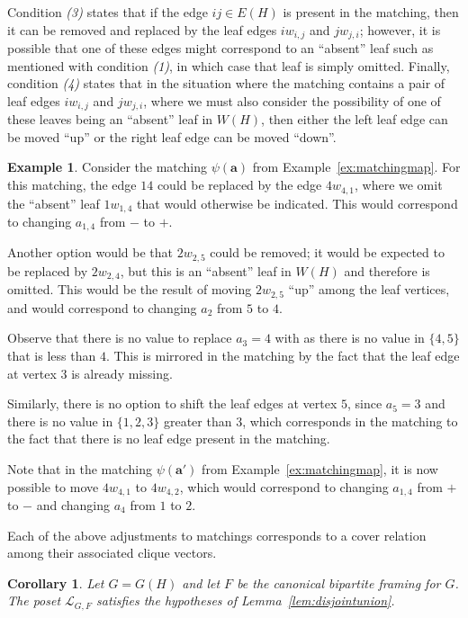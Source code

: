 \documentclass[12pt]{amsart}
\newtheorem{corollary}[theorem]{Corollary}
\theoremstyle{definition}
\newtheorem{example}[theorem]{Example}
\newcommand\ba{\mathbf{a}}
\newcommand{\scrL}{\mathscr{L}}
\begin{document}
Condition \emph{(3)} states that if the edge $ij\in E(H)$ is present in the matching, then it can be removed and replaced by the leaf edges $iw_{i,j}$ and $jw_{j,i}$; however, it is possible that one of these edges might correspond to an ``absent'' leaf such as mentioned with condition \emph{(1)}, in which case that leaf is simply omitted.
Finally, condition \emph{(4)} states that in the situation where the matching contains a pair of leaf edges $iw_{i,j}$ and $jw_{j,i}$, where we must also consider the possibility of one of these leaves being an ``absent'' leaf in $W(H)$, then either the left leaf edge can be moved ``up'' or the right leaf edge can be moved ``down''.

\begin{example}
    Consider the matching $\psi(\ba)$ from Example~\ref{ex:matchingmap}.
    For this matching, the edge $14$ could be replaced by the edge $4w_{4,1}$, where we omit the ``absent'' leaf $1w_{1,4}$ that would otherwise be indicated.
    This would correspond to changing $a_{1,4}$ from $-$ to $+$.
    
    Another option would be that $2w_{2,5}$ could be removed; it would be expected to be replaced by $2w_{2,4}$, but this is an ``absent'' leaf in $W(H)$ and therefore is omitted.
    This would be the result of moving $2w_{2,5}$ ``up'' among the leaf vertices, and would correspond to changing $a_2$ from $5$ to $4$.

    Observe that there is no value to replace $a_3=4$ with as there is no value in $\{4,5\}$ that is less than $4$. 
    This is mirrored in the matching by the fact that the leaf edge at vertex $3$ is already missing.
    
    Similarly, there is no option to shift the leaf edges at vertex $5$, since $a_5=3$ and there is no value in $\{1,2,3\}$ greater than $3$, which corresponds in the matching to the fact that there is no leaf edge present in the matching.

    Note that in the matching $\psi(\ba')$ from Example~\ref{ex:matchingmap}, it is now possible to move $4w_{4,1}$ to $4w_{4,2}$, which would correspond to changing $a_{1,4}$ from $+$ to $-$ and changing $a_4$ from $1$ to $2$.

    Each of the above adjustments to matchings corresponds to a cover relation among their associated clique vectors.
\end{example}

\begin{corollary}\label{cor:dualgraphsatisfieslemma}
Let $G = G(H)$ and let $F$ be the canonical bipartite framing for $G$.
The poset $\scrL_{G,F}$ satisfies the hypotheses of Lemma~\ref{lem:disjointunion}.
\end{corollary}
\end{document}
